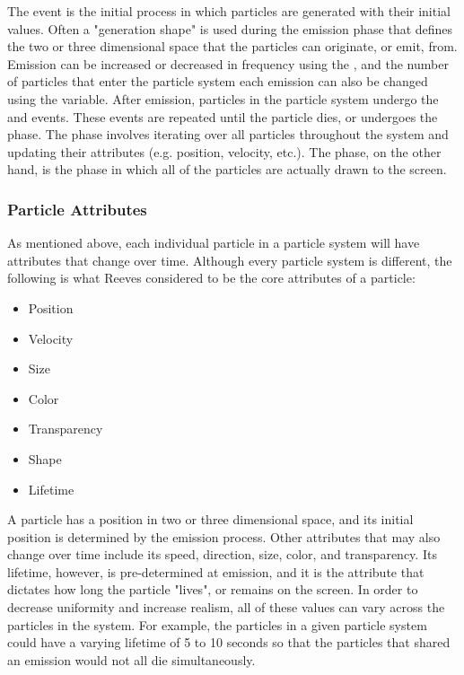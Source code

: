 The  event is the initial process in which particles are generated with their initial values. Often a "generation shape"\cite{Reeves1983ParticleSystems} is used during the emission phase that defines the two or three dimensional space that the particles can originate, or emit, from. Emission can be increased or decreased in frequency using the , and the number of particles that enter the particle system each emission can also be changed using the  variable. After emission, particles in the particle system undergo the  and  events. These events are repeated until the particle dies, or undergoes the  phase. The  phase involves iterating over all particles throughout the system and updating their attributes (e.g. position, velocity, etc.). The  phase, on the other hand, is the phase in which all of the particles are actually drawn to the screen.

\subsubsection{Particle Attributes}

As mentioned above, each individual particle in a particle system will have attributes that change over time. Although every particle system is different, the following is what Reeves considered to be the core attributes of a particle:

\begin{itemize}
	\itemsep-1.0em
	\item Position
	\item Velocity
	\item Size
	\item Color
	\item Transparency
	\item Shape
	\item Lifetime
\end{itemize}

A particle has a position in two or three dimensional space, and its initial position is determined by the emission process. Other attributes that may also change over time include its speed, direction, size, color, and transparency. Its lifetime, however, is pre-determined at emission, and it is the attribute that dictates how long the particle "lives", or remains on the screen. In order to decrease uniformity and increase realism, all of these values can vary across the particles in the system. For example, the particles in a given particle system could have a varying lifetime of 5 to 10 seconds so that the particles that shared an emission would not all die simultaneously.

